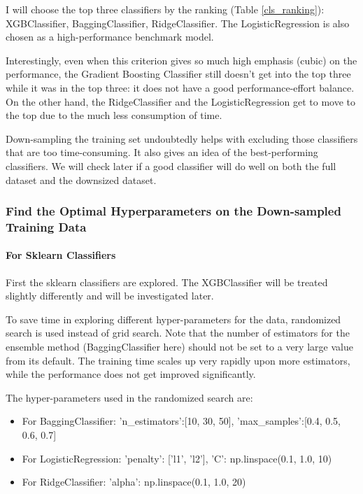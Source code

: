 \documentclass[a4paper]{article}
\begin{document}
			I will choose the top three classifiers by the ranking (Table \ref{cls_ranking}): XGBClassifier, BaggingClassifier, RidgeClassifier. The LogisticRegression is also chosen as a high-performance benchmark model.
			
			Interestingly, even when this criterion gives so much high emphasis (cubic) on the performance, the Gradient Boosting Classifier still doesn't get into the top three while it was in the top three: it does not have a good performance-effort balance. On the other hand, the RidgeClassifier and the LogisticRegression get to move to the top due to the much less consumption of time.
			
			Down-sampling the training set undoubtedly helps with excluding those classifiers that are too time-consuming. It also gives an idea of the best-performing classifiers. We will check later if a good classifier will do well on both the full dataset and the downsized dataset.
			
			\subsubsection{Find the Optimal Hyperparameters on the Down-sampled Training Data}
			
			\paragraph{For Sklearn Classifiers}
			First the sklearn classifiers are explored. The XGBClassifier will be treated slightly differently and will be investigated later.
			
			To save time in exploring different hyper-parameters for the data, randomized search is used instead of grid search. Note that the number of estimators for the ensemble method (BaggingClassifier here) should not be set to a very large value from its default. The training time scales up very rapidly upon more estimators, while the performance does not get improved significantly.
			
			The hyper-parameters used in the randomized search are:
			
			\begin{itemize}
				\item For BaggingClassifier: {'n\_estimators':[10, 30, 50], 'max\_samples':[0.4, 0.5, 0.6, 0.7]}
				\item For LogisticRegression: {'penalty': ['l1', 'l2'], 'C': np.linspace(0.1, 1.0, 10)} 
				\item For RidgeClassifier: {'alpha': np.linspace(0.1, 1.0, 20)} 
			\end{itemize}
			
\end{document}
